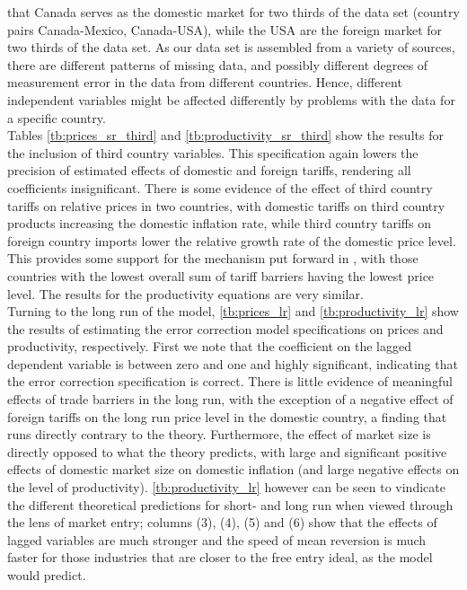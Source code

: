 that Canada serves as the domestic market for two thirds of the data set (country
pairs Canada-Mexico, Canada-USA), while the USA are the foreign market for 
two thirds of the data set. As our data set is assembled from a variety of sources, 
there are different patterns of missing data, and possibly different degrees of
measurement error in the data from different countries. Hence, different independent
variables might be affected differently by problems with the data for a specific
country. \\
Tables \ref{tb:prices_sr_third} and \ref{tb:productivity_sr_third} show the results
for the inclusion of third country variables. This specification again lowers
the precision of estimated effects of domestic and foreign tariffs, rendering
all coefficients insignificant. There is some evidence of the effect of third
country tariffs on relative prices in two countries, with domestic tariffs on
third country products increasing the domestic inflation rate, while third country
tariffs on foreign country imports lower the relative growth rate of the domestic
price level. This provides some support for the mechanism put forward in 
\citet{MelitzOttaviano2008}, with those countries with the lowest overall sum 
of tariff barriers having the lowest price level. The results for the 
productivity equations are very similar. \\
Turning to the long run of the model, \ref{tb:prices_lr} and \ref{tb:productivity_lr}
show the results of estimating the error correction model specifications on prices
and productivity, respectively. First we note that the coefficient on the lagged
dependent variable is between zero and one and highly significant, indicating 
that the error correction specification is correct. There is little evidence
of meaningful effects of trade barriers in the long run, with the exception 
of a negative effect of foreign tariffs on the long run price level in the domestic
country, a finding that runs directly contrary to the theory. Furthermore, the 
effect of market size is directly opposed to what the theory predicts, with large
and significant positive effects of domestic market size on domestic inflation (and
large negative effects on the level of productivity). \ref{tb:productivity_lr} 
however can be seen to vindicate the different theoretical predictions for short-
and long run when viewed through the lens of market entry; columns (3), (4), (5)
and (6) show that the effects of lagged variables are much stronger and the 
speed of mean reversion is much faster for those industries that are closer to 
the free entry ideal, as the model would predict.


